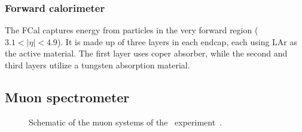 \FloatBarrier
\subsubsection{Forward calorimeter} 
\label{sec:fcal}

The FCal captures energy from particles in the very forward region
($3.1 < |\eta| < 4.9$).
It is made up of three layers in each endcap, each using LAr as the active
material.
The first layer uses coper absorber, while the second and third layers utilize
a tungsten absorption material.

\FloatBarrier
\subsection{Muon spectrometer} 
\label{sec:ms}

\begin{figure}[ht]
  \caption{
    Schematic of the muon systems of the
    \atlas\ experiment~\cite{Pequenao:1095929}.
  }
  \label{fig:ms_cartoon}
\end{figure}

